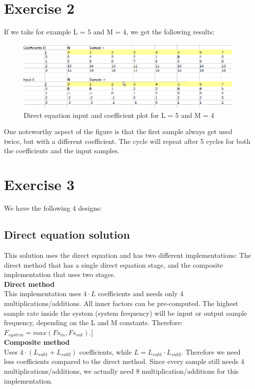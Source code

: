 \documentclass[a4paper,twoside,11pt, fleqn]{article}
\begin{document}
\newpage
\section{Exercise 2}
If we take for example L = 5 and M = 4, we get the following results:
\begin{figure}[h]
	\includegraphics[scale = 0.8]{Images/repeat}
    \caption{Direct equation input and coefficient plot for L = 5 and M = 4}
\end{figure}

One noteworthy aspect of the figure is that the first sample always get used twice, but with a different coefficient. The cycle will repeat after 5 cycles for both the coefficients and the input samples.

\section{Exercise 3}
We have the following 4 designs: 

\subsection{Direct equation solution}
This solution uses the direct equation and has two different implementations: The direct method that has a single direct equation stage, and the composite implementation that uses two stages.\\

\textbf{Direct method}\\
This implementation uses $4\cdot L$ coefficients and needs only 4 multiplications/additions. All inner factors can be pre-computed.
\smallskip
The highest sample rate inside the system (system frequency) will be input or output sample frequency, depending on the L and M constants. Therefore: $F_{system} = max(Fs_{in}, Fs_{out})$.]\\
 
\textbf{Composite method}\\
Uses $4\cdot (L_{sub1} + L_{sub2})$ coefficients, while $L = L_{sub1} \cdot L_{sub2}$. Therefore we need less coefficients compared to the direct method. Since every sample still needs 4 multiplications/additions, we actually need 8 multiplication/additions for this implementation.
\end{document}
